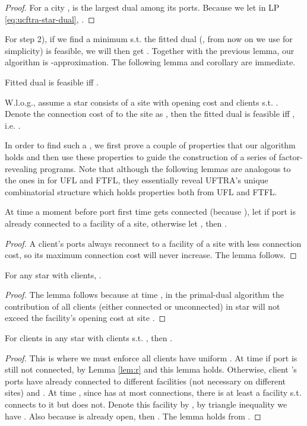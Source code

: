 \documentclass[10pt]{llncs}
\begin{document}
\begin{proof}
For a city ,  is the largest dual among its
ports. Because we let  in LP \eqref{eq:ucftra-star-dual},
.
\end{proof}
For step 2), if we find a minimum  s.t. the fitted dual 
(, from now on we use 
for simplicity) is feasible, we will then get .
Together with the previous lemma, our algorithm is -approximation.
The following lemma and corollary are immediate.
\begin{lemma}
Fitted dual  is feasible iff .\end{lemma}
\begin{corollary}
W.l.o.g., assume a star  consists of a site with opening cost
 and  clients s.t. .
Denote the connection cost of  to the site as , then
the fitted dual is feasible iff ,
i.e. .\label{cor:1}
\end{corollary}
In order to find such a , we first prove a couple of properties
that our algorithm holds and then use these properties to guide the
construction of a series of factor-revealing programs. Note that although
the following lemmas are analogous to the ones in \cite{Jain03dualfitting,Swamy08FTFL2.076}
for UFL and FTFL, they essentially reveal UFTRA's unique combinatorial
structure which holds properties both from UFL and FTFL.
\begin{lemma}
At time a moment before port 
first time gets connected (because ),
 let  if port 
is already connected to a facility of a site, otherwise let 
, then .\label{lem:r}\end{lemma}
\begin{proof}
A client's ports always reconnect to a facility of a site with less
connection cost, so its maximum connection cost will never increase.
The lemma follows.\end{proof}
\begin{lemma}
For any star  with  clients, .\label{lem:contri}\end{lemma}
\begin{proof}
The lemma follows because at time , in the
primal-dual algorithm the contribution of all clients (either connected
or unconnected) in star  will not exceed the facility's opening
cost at site .\end{proof}
\begin{lemma}
For clients  in any star  with  clients s.t. 
, then .\label{lem:tri}\end{lemma}
\begin{proof}
This is where we must enforce all clients have uniform .
At time if port 
is still not connected, by Lemma \ref{lem:r} 
and this lemma holds. Otherwise, client 's ports have already
connected to  different facilities (not necessary on different
sites) and . At time , since  has
at most  connections, there is at least a facility s.t. 
connects to it but  does not. Denote this facility by , by
triangle inequality we have .
Also because  is already open, then .
The lemma holds from .\end{proof}
\end{document}
